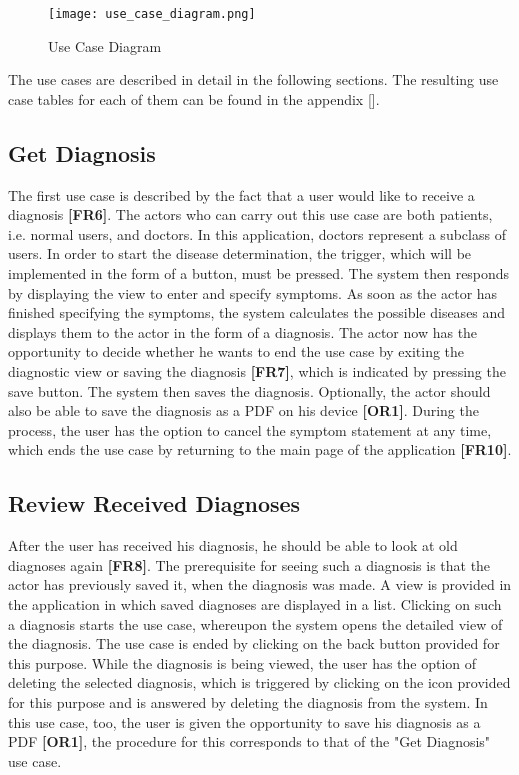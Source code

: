 \begin{figure}[h]
	\centering
	\texttt{[image: use\_case\_diagram.png]}
	\caption[Use Case Diagram]{Use Case Diagram}
\end{figure}

The use cases are described in detail in the following sections. The resulting use case tables for each of them can be found in the appendix [].

\subsection{Get Diagnosis}
The first use case is described by the fact that a user would like to receive a diagnosis \textbf{[FR6]}. The actors who can carry out this use case are both patients, i.e. normal users, and doctors. In this application, doctors represent a subclass of users. In order to start the disease determination, the trigger, which will be implemented in the form of a button, must be pressed. The system then responds by displaying the view to enter and specify symptoms. As soon as the actor has finished specifying the symptoms, the system calculates the possible diseases and displays them to the actor in the form of a diagnosis. The actor now has the opportunity to decide whether he wants to end the use case by exiting the diagnostic view or saving the diagnosis \textbf{[FR7]}, which is indicated by pressing the save button. The system then saves the diagnosis. Optionally, the actor should also be able to save the diagnosis as a PDF on his device \textbf{[OR1]}. During the process, the user has the option to cancel the symptom statement at any time, which ends the use case by returning to the main page of the application \textbf{[FR10]}.

\subsection{Review Received Diagnoses}
After the user has received his diagnosis, he should be able to look at old diagnoses again \textbf{[FR8]}. The prerequisite for seeing such a diagnosis is that the actor has previously saved it, when the diagnosis was made. A view is provided in the application in which saved diagnoses are displayed in a list. Clicking on such a diagnosis starts the use case, whereupon the system opens the detailed view of the diagnosis. The use case is ended by clicking on the back button provided for this purpose. While the diagnosis is being viewed, the user has the option of deleting the selected diagnosis, which is triggered by clicking on the icon provided for this purpose and is answered by deleting the diagnosis from the system. In this use case, too, the user is given the opportunity to save his diagnosis as a PDF \textbf{[OR1]}, the procedure for this corresponds to that of the "Get Diagnosis" use case.

